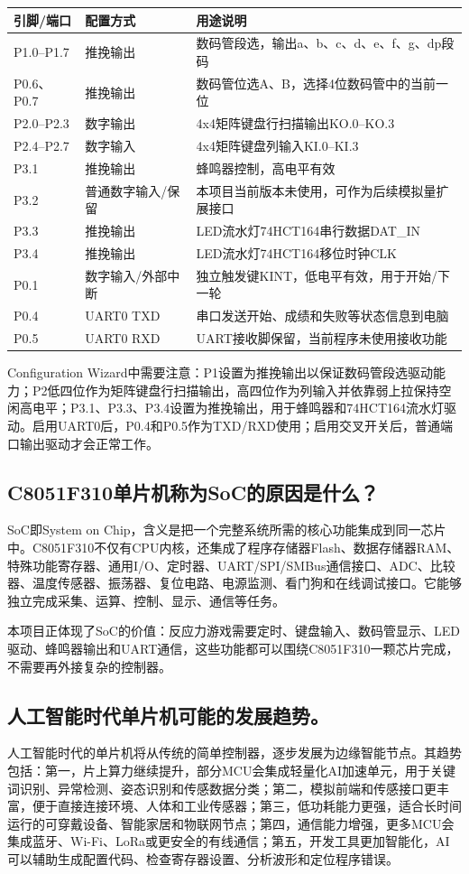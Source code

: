 ﻿\documentclass[UTF8,a4paper,12pt]{ctexart}
\begin{document}
\begin{longtable}{>{\centering\arraybackslash}p{3cm}p{4cm}p{7cm}}
\toprule
引脚/端口 & 配置方式 & 用途说明 \\
\midrule
P1.0--P1.7 & 推挽输出 & 数码管段选，输出a、b、c、d、e、f、g、dp段码 \\
P0.6、P0.7 & 推挽输出 & 数码管位选A、B，选择4位数码管中的当前一位 \\
P2.0--P2.3 & 数字输出 & 4x4矩阵键盘行扫描输出KO.0--KO.3 \\
P2.4--P2.7 & 数字输入 & 4x4矩阵键盘列输入KI.0--KI.3 \\
P3.1 & 推挽输出 & 蜂鸣器控制，高电平有效 \\
P3.2 & 普通数字输入/保留 & 本项目当前版本未使用，可作为后续模拟量扩展接口 \\
P3.3 & 推挽输出 & LED流水灯74HCT164串行数据DAT\_IN \\
P3.4 & 推挽输出 & LED流水灯74HCT164移位时钟CLK \\
P0.1 & 数字输入/外部中断 & 独立触发键KINT，低电平有效，用于开始/下一轮 \\
P0.4 & UART0 TXD & 串口发送开始、成绩和失败等状态信息到电脑 \\
P0.5 & UART0 RXD & UART接收脚保留，当前程序未使用接收功能 \\
\bottomrule
\end{longtable}

Configuration Wizard中需要注意：P1设置为推挽输出以保证数码管段选驱动能力；P2低四位作为矩阵键盘行扫描输出，高四位作为列输入并依靠弱上拉保持空闲高电平；P3.1、P3.3、P3.4设置为推挽输出，用于蜂鸣器和74HCT164流水灯驱动。启用UART0后，P0.4和P0.5作为TXD/RXD使用；启用交叉开关后，普通端口输出驱动才会正常工作。

\subsection{C8051F310单片机称为SoC的原因是什么？}
SoC即System on Chip，含义是把一个完整系统所需的核心功能集成到同一芯片中。C8051F310不仅有CPU内核，还集成了程序存储器Flash、数据存储器RAM、特殊功能寄存器、通用I/O、定时器、UART/SPI/SMBus通信接口、ADC、比较器、温度传感器、振荡器、复位电路、电源监测、看门狗和在线调试接口。它能够独立完成采集、运算、控制、显示、通信等任务。

本项目正体现了SoC的价值：反应力游戏需要定时、键盘输入、数码管显示、LED驱动、蜂鸣器输出和UART通信，这些功能都可以围绕C8051F310一颗芯片完成，不需要再外接复杂的控制器。

\subsection{人工智能时代单片机可能的发展趋势。}
人工智能时代的单片机将从传统的简单控制器，逐步发展为边缘智能节点。其趋势包括：第一，片上算力继续提升，部分MCU会集成轻量化AI加速单元，用于关键词识别、异常检测、姿态识别和传感数据分类；第二，模拟前端和传感接口更丰富，便于直接连接环境、人体和工业传感器；第三，低功耗能力更强，适合长时间运行的可穿戴设备、智能家居和物联网节点；第四，通信能力增强，更多MCU会集成蓝牙、Wi-Fi、LoRa或更安全的有线通信；第五，开发工具更加智能化，AI可以辅助生成配置代码、检查寄存器设置、分析波形和定位程序错误。
\end{document}
